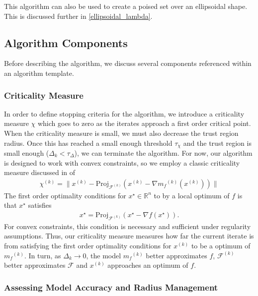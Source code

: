 \documentclass{article}
\theoremstyle{case}
\newcommand{\chik}{{\chi^{(k)}}}
\newcommand{\dk}{\Delta_k}
\newcommand{\feasiblek}{{\mathcal F^{(k)}}}
\newcommand{\feasible}{{\mathcal F}}
\newcommand{\gradf}{\nabla f}
\newcommand{\mfk}{{{m}_f}^{(k)}}
\newcommand{\Rn}{\mathbb R^n}
\newcommand{\xk}{{x^{(k)}}}
\begin{document}
This algorithm can also be used to create a poised set over an ellipsoidal shape.
This is discussed further in \cref{ellipsoidal_lambda}.



\subsection{Algorithm Components}

Before describing the algorithm, we discuss several components referenced within an algorithm template.

\subsubsection{Criticality Measure}

In order to define stopping criteria for the algorithm, we introduce a criticality measure $\chi$ which goes to zero as the iterates approach a first order critical point.
When the criticality measure is small, we must also decrease the trust region radius.
Once this has reached a small enough threshold $\tau_{\chi}$ and the trust region is small enough ($\Delta_k < \tau_{\Delta}$), we can terminate the algorithm.
For now, our algorithm is designed to work with convex constraints, so we employ a classic criticality measure discussed in \cite{ConnGoulToin00} of
\begin{align}
\label{define_criticallity_measure}
\chik = \|\xk - \text{Proj}_{\feasiblek}(\xk- \nabla \mfk(\xk))\|
\end{align}
The first order optimality conditions for $x^{\star} \in \Rn$ to by a local optimum of $f$ is that $x^{\star}$ satisfies
\begin{align*}
x^{\star} = \text{Proj}_{\feasiblek}\left(x^{\star} - \gradf(x^{\star})\right).
\end{align*}
For convex constraints, this condition is necessary and sufficient under regularity assumptions.
Thus, our criticality measure measures how far the current iterate is from satisfying the first order optimality conditions for $\xk$ to be a optimum of $\mfk$.
In turn, as $\dk \to 0$, the model $\mfk$ better approximates $f$, $\feasiblek$ better approximates $\feasible$ and $\xk$ approaches an optimum of $f$.

\subsubsection{Assessing Model Accuracy and Radius Management}
\end{document}
